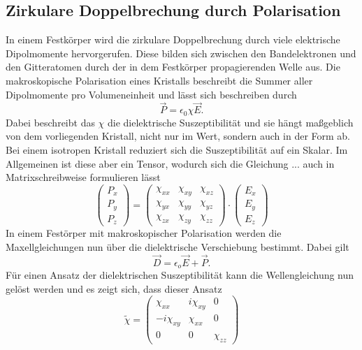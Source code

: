 \subsection{Zirkulare Doppelbrechung durch Polarisation}
In einem Festkörper wird die zirkulare Doppelbrechung durch viele elektrische Dipolmomente hervorgerufen. Diese bilden sich zwischen den Bandelektronen
und den Gitteratomen durch der in dem Festkörper propagierenden Welle aus.
Die makroskopische Polarisation eines Kristalls beschreibt die Summer aller Dipolmomente pro Volumeneinheit und lässt sich beschreiben durch
\begin{equation*}
\vec{P} = \epsilon_0 \chi \vec{E}.
\end{equation*}
Dabei beschreibt das $\chi$ die dielektrische Suszeptibilität und sie hängt maßgeblich von dem vorliegenden Kristall, nicht nur im Wert, sondern auch in der Form ab.
Bei einem isotropen Kristall reduziert sich die Suszeptibilität auf ein Skalar. Im Allgemeinen ist diese aber ein Tensor, wodurch sich die Gleichung ... auch in Matrixschreibweise formulieren lässt
\begin{equation*}
\begin{pmatrix}
P_x \\
P_y \\
P_z 
\end{pmatrix} = 
\begin{pmatrix}
\chi_{xx} & \chi_{xy} & \chi_{xz} \\
\chi_{yx} & \chi_{yy} & \chi_{yz} \\
\chi_{zx} & \chi_{zy} & \chi_{zz}
\end{pmatrix}
\cdot 
\begin{pmatrix}
E_x \\
E_y \\
E_z 
\end{pmatrix}
\end{equation*}
In einem Festörper mit makroskopischer Polarisation werden die Maxellgleichungen nun über die dielektrische Verschiebung bestimmt. 
Dabei gilt
\begin{equation*}
\vec{D} = \epsilon_o \vec{E} + \vec{P}.
\end{equation*}
Für einen Ansatz der dielektrischen Suszeptibilität kann die Wellengleichung nun gelöst werden und es zeigt sich, dass dieser Ansatz
\begin{equation*}
    \tilde{\chi} = \begin{pmatrix}
        \chi_{xx} & i\chi_{xy} & 0 \\
        -i\chi_{xy} & \chi_{xx} & 0 \\
        0 & 0 & \chi_{zz}
        \end{pmatrix}
\end{equation*}
